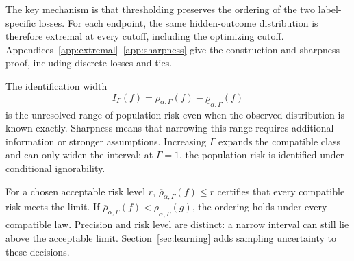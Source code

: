The key mechanism is that thresholding preserves the ordering of the two label-specific losses. For
each endpoint, the same hidden-outcome distribution is therefore extremal at every cutoff, including
the optimizing cutoff. Appendices~\ref{app:extremal}--\ref{app:sharpness} give the construction and
sharpness proof, including discrete losses and ties.

The identification width
\[
 I_\Gamma(f)=\overline\rho_{\alpha,\Gamma}(f)-\underline\rho_{\alpha,\Gamma}(f)
\]
is the unresolved range of population risk even when the observed distribution is known exactly. Sharpness means that narrowing this range requires additional information or stronger assumptions. Increasing \(\Gamma\) expands the compatible class and can only widen the interval; at \(\Gamma=1\), the population risk is identified under conditional ignorability.

For a chosen acceptable risk level \(r\), \(\overline\rho_{\alpha,\Gamma}(f)\le r\) certifies that
every compatible risk meets the limit. If
\(\overline\rho_{\alpha,\Gamma}(f)<\underline\rho_{\alpha,\Gamma}(g)\), the ordering holds under
every compatible law. Precision and risk level are distinct: a narrow interval can still lie above
the acceptable limit. Section~\ref{sec:learning} adds sampling uncertainty to these decisions.
